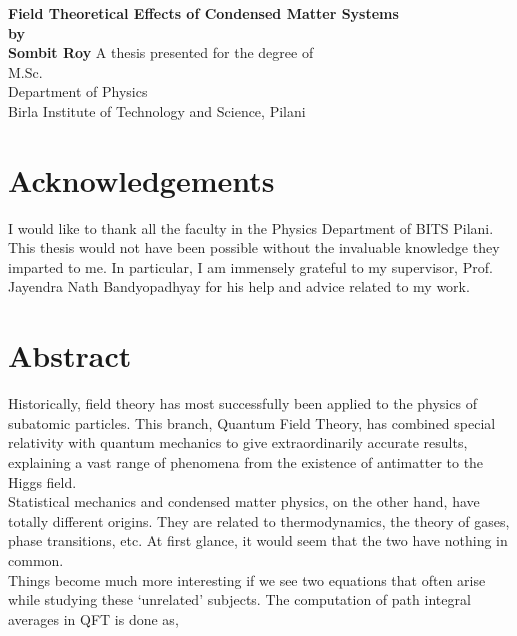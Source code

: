\documentclass[12pt]{report}
\begin{document}
\thispagestyle{empty}
\begin{center}
    \Huge
    \textbf{Field Theoretical Effects of Condensed Matter Systems}\\
    \vspace{1.5cm}
    \textbf{by}\\
    \vspace{0.5cm}
    \textbf{Sombit Roy}
    \vfill
    A thesis presented for the degree of\\
    M.Sc.\\
    \vspace{0.5cm}
    \Large Department of Physics\\
    Birla Institute of Technology and Science, Pilani
    
\end{center}

\chapter*{Acknowledgements}
I would like to thank all the faculty in the Physics Department of BITS Pilani. This thesis would not have been possible without the invaluable knowledge they imparted to me. In particular, I am immensely grateful to my supervisor, Prof. Jayendra Nath Bandyopadhyay for his help and advice related to my work. 

\chapter*{Abstract}
Historically, field theory has most successfully been applied to the physics of subatomic particles. This branch, Quantum Field Theory, has combined special relativity with quantum mechanics to give extraordinarily accurate results, explaining a vast range of phenomena from the existence of antimatter to the Higgs field. \\ 

\noindent Statistical mechanics and condensed matter physics, on the other hand, have totally different origins. They are related to thermodynamics, the theory of gases, phase transitions, etc. At first glance, it would seem that the two have nothing in common. \\ 

\noindent Things become much more interesting if we see two equations that often arise while studying these `unrelated' subjects. The computation of path integral averages in QFT is done as,
\end{document}
